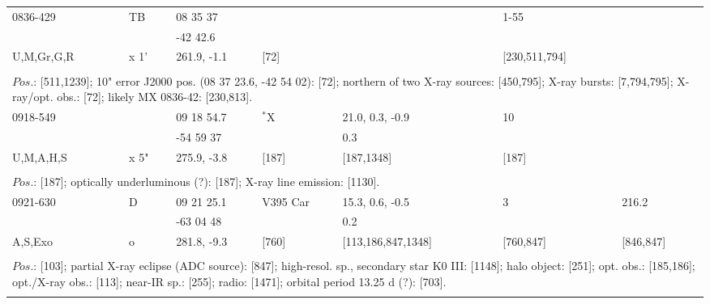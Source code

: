 \documentclass{aa}
\begin{document}
\begin{tabular}{p{2.5cm}p{1cm}p{1.8cm}p{2.3cm}p{3.3cm}p{2.0cm}p{2.2cm}}
\noalign{\smallskip}
0836-429       & TB            & 08 35 37                &                    &           & 1-55                     &      \\
                        &                  & -42 42.6                  &                    &           &                              &    \\
U,M,Gr,G,R  & x 1'            & 261.9, -1.1              &   [72]          &           & [230,511,794]     &    \\
\\
\multicolumn{7}{p{17.5cm}}{
$Pos$.: [511,1239]; 10" error J2000 pos. (08 37 23.6, -42 54 02): [72]; northern of two X-ray sources: [450,795]; 
X-ray bursts: [7,794,795]; X-ray/opt. obs.: [72]; likely MX 0836-42: [230,813].}\\
\noalign{\smallskip}
\hline

\noalign{\smallskip}
0918-549            &              & 09 18 54.7       & $^*$X             & 21.0, 0.3, -0.9    & 10          &      \\
                             &              & -54 59 37         &                         & 0.3                      &                &    \\
U,M,A,H,S          & x 5"       & 275.9, -3.8       & [187]              & [187,1348]         & [187]      &    \\
\\
\multicolumn{7}{p{17.5cm}}{
$Pos$.: [187]; optically underluminous (?): [187]; X-ray line emission: [1130].}\\
\noalign{\smallskip}
\hline

\noalign{\smallskip}
0921-630        & D            & 09 21 25.1      & V395 Car      & 15.3, 0.6, -0.5                 & 3                  & 216.2          \\
                         &                & -63 04 48        &                         & 0.2                                   &                      &                     \\
A,S,Exo          & o             & 281.8, -9.3      & [760]               & [113,186,847,1348]     & [760,847]    & [846,847]   \\
\\
\multicolumn{7}{p{17.5cm}}{
$Pos$.: [103]; partial X-ray eclipse (ADC source): [847]; high-resol. sp., secondary star K0 III: [1148]; halo object: 
[251]; opt. obs.: [185,186]; opt./X-ray obs.: [113]; near-IR sp.: [255]; radio: [1471]; orbital period 13.25 d (?): [703].}\\
\noalign{\smallskip}
\hline


\end{tabular}
\end{document}
